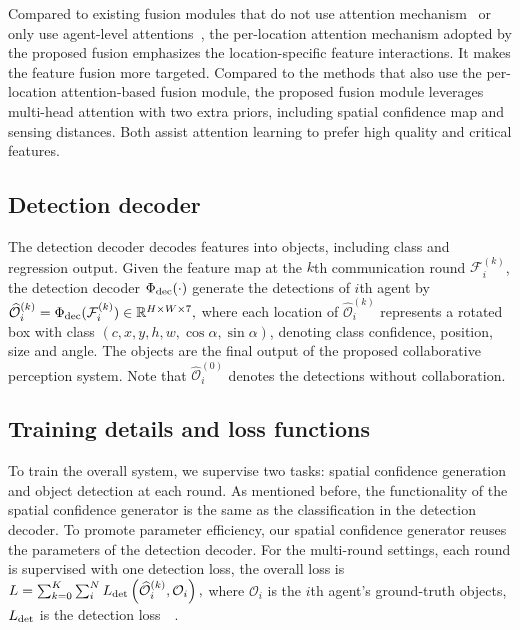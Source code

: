 Compared to existing fusion modules that do not use attention mechanism~\cite{v2vnet} or only use agent-level attentions~\cite{when2com}, the per-location attention mechanism adopted by the proposed fusion emphasizes the location-specific feature interactions. It  makes the feature fusion more targeted. Compared to the methods that also use the per-location attention-based fusion module\cite{disconet,OPV2V,xu2022v2x}, the proposed fusion module leverages multi-head attention with two extra priors, including spatial confidence map and sensing distances. Both assist attention learning to prefer high quality and critical features.

\vspace{-2mm}
\subsection{Detection decoder}
\label{sec:Decoder}
\vspace{-2mm}
The detection decoder decodes features into objects, including class and regression output. 
Given the feature map at the $k$th communication round $\mathcal{F}_i^{(k)}$, the detection decoder $\Phi_{\rm dec}(\cdot)$ generate the detections of $i$th agent by
$
     \widehat{\mathcal{O}}_i^{(k)}  =  \Phi_{\rm dec}(\mathcal{F}_i^{(k)}) \in \mathbb{R}^{H \times W \times 7},
$
where each location of $\widehat{\mathcal{O}}_i^{(k)}$ represents a rotated box with class $(c,x,y,h,w, \cos\alpha, \sin\alpha)$, denoting class confidence, position, size and angle. The objects are the final output of the proposed collaborative perception system. Note that $\widehat{\mathcal{O}}_i^{(0)}$ denotes the detections without collaboration.

\vspace{-2mm}
\subsection{Training details and loss functions}
\vspace{-2mm}
To train the overall system, we supervise two tasks: spatial confidence generation and object detection at each round. As mentioned before, the functionality of the spatial confidence generator is the same as the classification in the detection decoder. To promote parameter efficiency, our spatial confidence generator reuses the parameters of the detection decoder. For the multi-round settings, each round is supervised with one detection loss, the overall loss is
$
    L = \sum_{k=0}^K\sum_i^{N} L_{\rm det} \left(\widehat{\mathcal{O}}_i^{(k)},\mathcal{O}_i \right),
$
where $\mathcal{O}_i$ is the $i$th agent's ground-truth objects, $L_{\rm det}$ is the detection loss~~\cite{zhou2019objects}.


